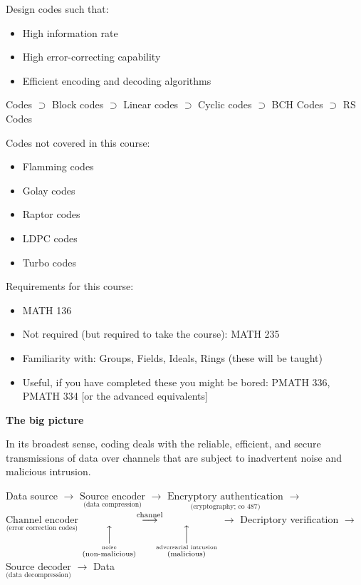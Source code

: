 Design codes such that:
\begin{itemize}
    \item High information rate
    \item High error-correcting capability
    \item Efficient encoding and decoding algorithms
\end{itemize}

Codes $ \supset $ Block codes $ \supset $  Linear codes
$ \supset $  Cyclic codes $ \supset $ BCH Codes
$ \supset $ RS Codes

Codes not covered in this course:
\begin{itemize}
    \item Flamming codes
    \item Golay codes
    \item Raptor codes
    \item LDPC codes
    \item Turbo codes
\end{itemize}

Requirements for this course:
\begin{itemize}
    \item MATH 136
    \item Not required (but required to take the course): MATH 235
    \item Familiarity with: Groups, Fields, Ideals, Rings (these will be taught)
    \item Useful, if you have completed these you might be bored:
          PMATH 336, PMATH 334 [or the advanced equivalents]
\end{itemize}

\textbf{The big picture}

In its broadest sense, coding deals with the reliable, efficient, and secure
transmissions of data over channels that are subject to inadvertent noise and
malicious intrusion.

Data source
$ \rightarrow $
$ \underset{\text{(data compression)}}{\text{Source encoder}} $
$ \rightarrow $
$ \underset{\text{(cryptography; co 487)}}{\text{Encryptory authentication}} $
$ \rightarrow $
$ \underset{\text{(error correction codes)}}{\text{Channel encoder}} $
$ \underset
    {
        \overset{\Big\uparrow}{\overset{\text{noise}}{\text{(non-malicious)}}}\qquad
        \overset{\Big\uparrow}{\overset{\text{adversarial intrusion}}{\text{(malicious)}}}
    }
    {\overset{\text{channel}}{\longrightarrow}} $
$ \rightarrow $
Decriptory verification
$ \rightarrow $
$ \underset{\text{(data decompression)}}{\text{Source decoder}}  $
$ \rightarrow $
Data
